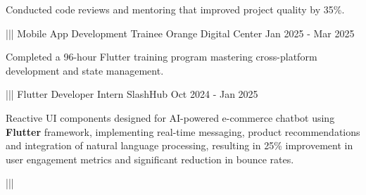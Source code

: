 {{        \item Conducted code reviews and mentoring that improved project quality by 35\%.
    }%
    |||
    {Mobile App Development Trainee}%
    {Orange Digital Center}%
    {Jan 2025 - Mar 2025}%
    {%
        \item Completed a 96-hour Flutter training program mastering cross-platform development and state management.
    }%
    |||
    {Flutter Developer Intern}%
    {SlashHub}%
    {Oct 2024 - Jan 2025}%
    {%
        \item Reactive UI components designed for AI-powered e-commerce chatbot using \textbf{Flutter} framework, implementing real-time messaging, product recommendations and integration of natural language processing, resulting in 25\% improvement in user engagement metrics and significant reduction in bounce rates.
    }%
    |||%
}


